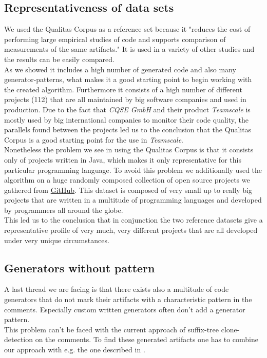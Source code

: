 \subsection{Representativeness of data sets}
We used the Qualitas Corpus as a reference set because it "reduces the cost of performing large empirical studies of code and supports comparison of measurements of the same artifacts."\cite[p.~1]{TemperoEwanandAnslowCraigandDietrichJensandHanTedandLiJingandLumpeMarkusandMeltonHaydenandNoble2010a} It is used in a variety of other studies and the results can be easily compared.\\
As we showed it includes a high number of generated code and also many generator-patterns, what makes it a good starting point to begin working with the created algorithm. Furthermore it consists of a high number of different projects (112) that are all maintained by big software companies and used in production. Due to the fact that \textit{CQSE GmbH} and their product \textit{Teamscale} is mostly used by big international companies to monitor their code quality, the parallels found between the projects led us to the conclusion that the Qualitas Corpus is a good starting point for the use in \textit{Teamscale}.\\
Nonetheless the problem we see in using the Qualitas Corpus is that it consists only of projects written in Java, which makes it only representative for this particular programming language. To avoid this problem we additionally used the algorithm on a huge randomly composed collection of open source projects we gathered from \href{github.com}{GitHub}. This dataset is composed of very small up to really big projects that are written in a multitude of programming languages and developed by programmers all around the globe.\\
This led us to the conclusion that in conjunction the two reference datasets give a representative profile of very much, very different projects that are all developed under very unique circumstances.

\subsection{Generators without pattern}
A last thread we are facing is that there exists also a multitude of code generators that do not mark their artifacts with a characteristic pattern in the comments. Especially custom written generators often don't add a generator pattern.\\
This problem can't be faced with the current approach of suffix-tree clone-detection on the comments. To find these generated artifacts one has to combine our approach with e.g. the one described in \cite{Bernwieser2014}.